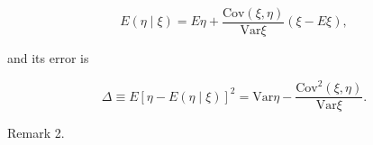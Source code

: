 $$E(\eta \mid \xi) = E\eta + \frac{\text{Cov}(\xi, \eta)}{\text{Var}\xi}(\xi - E\xi),$$

and its error is

$$\Delta \equiv E[\eta - E(\eta \mid \xi)]^2 = \text{Var}\eta - \frac{\text{Cov}^2(\xi, \eta)}{\text{Var}\xi}.$$

Remark 2.

